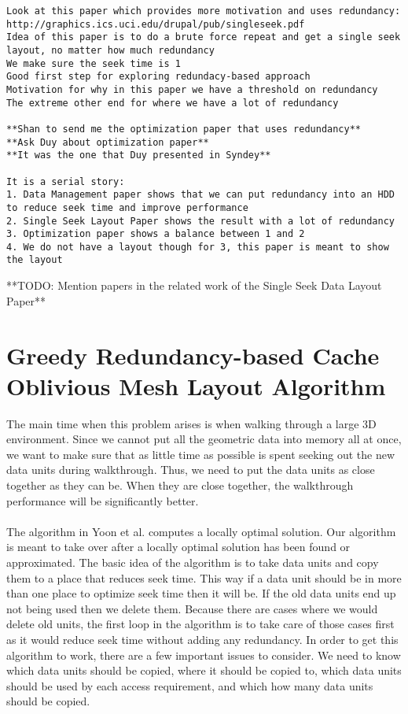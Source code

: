 \documentclass[11pt,psfig]{article}
\begin{document}
\begin{verbatim}
Look at this paper which provides more motivation and uses redundancy:
http://graphics.ics.uci.edu/drupal/pub/singleseek.pdf
Idea of this paper is to do a brute force repeat and get a single seek layout, no matter how much redundancy
We make sure the seek time is 1
Good first step for exploring redundacy-based approach
Motivation for why in this paper we have a threshold on redundancy 
The extreme other end for where we have a lot of redundancy 

**Shan to send me the optimization paper that uses redundancy**
**Ask Duy about optimization paper**
**It was the one that Duy presented in Syndey**

It is a serial story:
1. Data Management paper shows that we can put redundancy into an HDD to reduce seek time and improve performance
2. Single Seek Layout Paper shows the result with a lot of redundancy
3. Optimization paper shows a balance between 1 and 2
4. We do not have a layout though for 3, this paper is meant to show the layout
\end{verbatim}
**TODO: Mention papers in the related work of the Single Seek Data Layout Paper**\\

\section*{Greedy Redundancy-based Cache Oblivious Mesh Layout Algorithm}

The main time when this problem arises is when walking through a large 3D environment. Since we cannot put all the geometric data into memory all at once, we want to make sure that as little time as possible is spent seeking out the new data units during walkthrough. Thus, we need to put the data units as close together as they can be. When they are close together, the walkthrough performance will be significantly better. \\
\\
The algorithm in Yoon et al. computes a locally optimal solution. Our algorithm is meant to take over after a locally optimal solution has been found or approximated. The basic idea of the algorithm is to take data units and copy them to a place that reduces seek time. This way if a data unit should be in more than one place to optimize seek time then it will be. If the old data units end up not being used then we delete them. Because there are cases where we would delete old units, the first loop in the algorithm is to take care of those cases first as it would reduce seek time without adding any redundancy. In order to get this algorithm to work, there are a few important issues to consider. We need to know which data units should be copied, where it should be copied to, which data units should be used by each access requirement, and which how many data units should be copied. 
\end{document}
